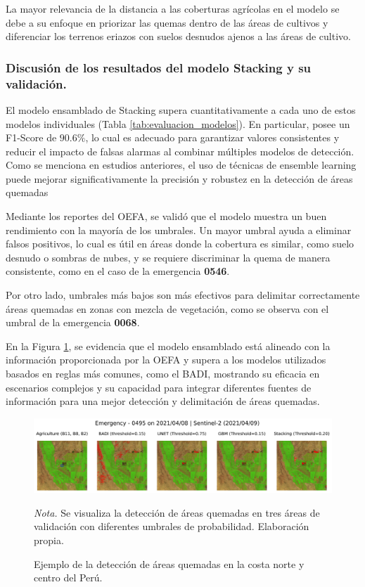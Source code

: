 La mayor relevancia de la distancia a las coberturas agrícolas en el modelo se debe a su enfoque en priorizar las quemas dentro de las áreas de cultivos y diferenciar los terrenos eriazos con suelos desnudos ajenos a las áreas de cultivo.


\subsubsection{Discusión de los resultados del modelo Stacking y su validación.}

El modelo ensamblado de Stacking supera cuantitativamente a cada uno de estos modelos individuales (Tabla \ref{tab:evaluacion_modelos}). En particular, posee un F1-Score de $90.6\%$, lo cual es adecuado para garantizar valores consistentes y reducir el impacto de falsas alarmas al combinar múltiples 
modelos de detección. Como se menciona en estudios anteriores, el uso de técnicas de ensemble learning puede mejorar significativamente la precisión y robustez en la detección de áreas quemadas \citep{lee_machine_2022}

Mediante los reportes del OEFA, se validó que el modelo muestra un buen rendimiento con la mayoría de los umbrales. Un mayor umbral ayuda a eliminar falsos positivos, lo cual es útil en áreas donde la cobertura es similar, como suelo desnudo o sombras de nubes, 
y se requiere discriminar la quema de manera consistente, como en el caso de la emergencia \textbf{0546}. 

Por otro lado, umbrales más bajos son más efectivos para delimitar correctamente áreas quemadas en zonas con mezcla de vegetación, 
como se observa con el umbral de la emergencia \textbf{0068}.

En la Figura \ref{fig:umbral}, se evidencia que el modelo ensamblado está alineado con la información proporcionada por la OEFA y supera a los modelos utilizados basados en reglas más comunes, como el BADI, mostrando su eficacia en escenarios complejos y su capacidad 
para integrar diferentes fuentes de información para una mejor detección y delimitación de áreas quemadas.

\begin{figure}[H]
    \centering
    \caption{Ejemplo de la detección de áreas quemadas en la costa norte y centro del Perú.}
    \includegraphics[width=1.01\textwidth]{img/8_capitulo6/0495.png}
    \label{fig:umbral}
    \begin{flushleft}
        \vspace{-\baselineskip}
        \textit{Nota.} Se visualiza la detección de áreas quemadas en tres áreas de validación con diferentes umbrales de probabilidad. Elaboración propia.
        \vspace{-\baselineskip}
    \end{flushleft}
\end{figure}

